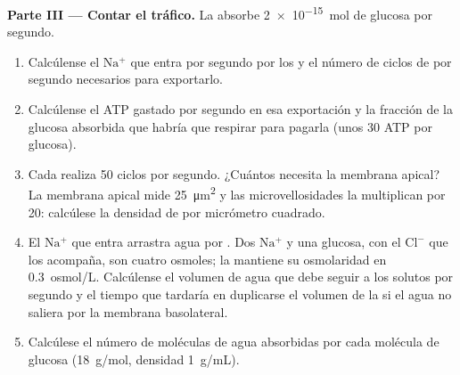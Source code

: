 \begin{problem}
\medskip
\noindent\textbf{Parte III --- Contar el tráfico.}
La  absorbe \qty{2e-15}{mol} de glucosa por segundo.
\begin{enumerate}[resume]
  \item Calcúlense el $\mathrm{Na^+}$ que entra por segundo por los
         y el número de ciclos de  por segundo
        necesarios para exportarlo.
  \item Calcúlense el ATP gastado por segundo en esa exportación y la
        fracción de la glucosa absorbida que habría que respirar para
        pagarla (unos 30 ATP por glucosa).
  \item Cada  realiza \qty{50}{} ciclos por segundo. ¿Cuántos
         necesita la membrana apical? La membrana apical mide
        \qty{25}{\micro m^2} y las microvellosidades la multiplican por
        \qty{20}{}: calcúlese la densidad de  por micrómetro
        cuadrado.
  \item El $\mathrm{Na^+}$ que entra arrastra agua por . Dos
        $\mathrm{Na^+}$ y una glucosa, con el $\mathrm{Cl^-}$ que los
        acompaña, son cuatro osmoles; la  mantiene su osmolaridad en
        \qty{0.3}{osmol/L}. Calcúlense el volumen de agua que debe seguir a
        los solutos por segundo y el tiempo que tardaría en duplicarse el
        volumen de la  si el agua no saliera por la membrana
        basolateral.
  \item Calcúlese el número de moléculas de agua absorbidas por cada
        molécula de glucosa (\qty{18}{g/mol}, densidad \qty{1}{g/mL}).
\end{enumerate}


\end{problem}
